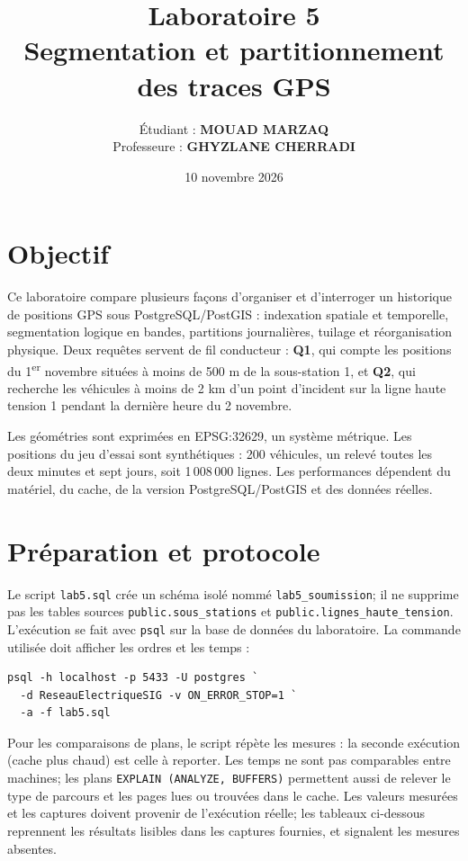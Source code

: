 \documentclass[11pt,a4paper]{article}
\title{\textbf{Laboratoire 5}\\Segmentation et partitionnement des traces GPS}
\author{Étudiant : \textbf{MOUAD MARZAQ}\\
Professeure : \textbf{GHYZLANE CHERRADI}}
\date{10 novembre 2026}
\begin{document}
\maketitle
\tableofcontents
\newpage

\section{Objectif}
Ce laboratoire compare plusieurs façons d'organiser et d'interroger un historique
de positions GPS sous PostgreSQL/PostGIS : indexation spatiale et temporelle,
segmentation logique en bandes, partitions journalières, tuilage et réorganisation
physique. Deux requêtes servent de fil conducteur : \textbf{Q1}, qui compte les
positions du 1\textsuperscript{er} novembre situées à moins de 500 m de la
sous-station 1, et \textbf{Q2}, qui recherche les véhicules à moins de 2 km d'un
point d'incident sur la ligne haute tension 1 pendant la dernière heure du 2 novembre.

Les géométries sont exprimées en EPSG:32629, un système métrique. Les positions
du jeu d'essai sont synthétiques : 200 véhicules, un relevé toutes les deux
minutes et sept jours, soit 1\,008\,000 lignes. Les performances dépendent du
matériel, du cache, de la version PostgreSQL/PostGIS et des données réelles.

\section{Préparation et protocole}
Le script \texttt{lab5.sql} crée un schéma isolé nommé
\texttt{lab5\_soumission}; il ne supprime pas les tables sources
\texttt{public.sous\_stations} et \texttt{public.lignes\_haute\_tension}.
L'exécution se fait avec \texttt{psql} sur la base de données du laboratoire.
La commande utilisée doit afficher les ordres et les temps :

\begin{verbatim}
psql -h localhost -p 5433 -U postgres `
  -d ReseauElectriqueSIG -v ON_ERROR_STOP=1 `
  -a -f lab5.sql
\end{verbatim}

Pour les comparaisons de plans, le script répète les mesures : la seconde
exécution (cache plus chaud) est celle à reporter. Les temps ne sont pas
comparables entre machines; les plans \texttt{EXPLAIN (ANALYZE, BUFFERS)}
permettent aussi de relever le type de parcours et les pages lues ou trouvées
dans le cache. Les valeurs mesurées et les captures doivent provenir de
l'exécution réelle; les tableaux ci-dessous reprennent les résultats lisibles
dans les captures fournies, et signalent les mesures absentes.
\end{document}
